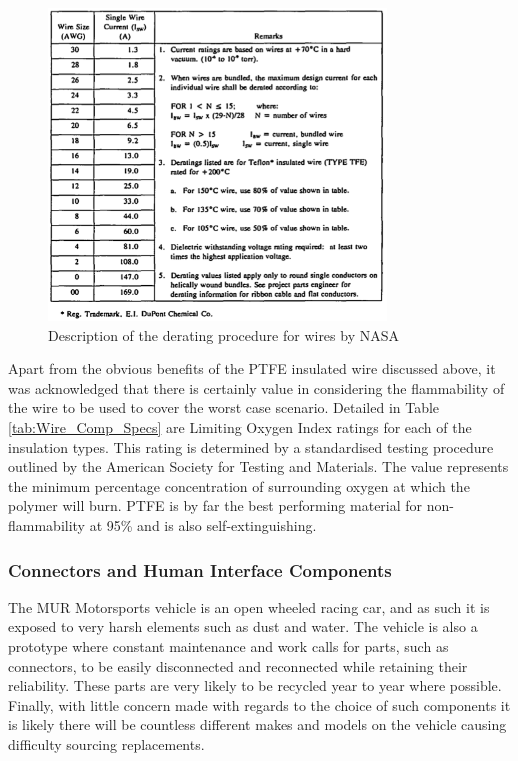 \begin{figure}[h!]
	\centering
	\includegraphics[width=0.8\textwidth]{NASA_wire_derating.png}
	\caption{Description of the derating procedure for wires by NASA\cite{MIL-STD-975M}}
	\label{fig:NASA_derate}
\end{figure}

Apart from the obvious benefits of the PTFE insulated wire discussed above, it was acknowledged that there is certainly value in considering the flammability of the wire to be used to cover the worst case scenario.  Detailed in Table \ref{tab:Wire_Comp_Specs} are Limiting Oxygen Index ratings for each of the insulation types.  This rating is determined by a standardised testing procedure outlined by the American Society for Testing and Materials\cite{ATSM_D570}.  The value represents the minimum percentage concentration of surrounding oxygen at which the polymer will burn.  PTFE is by far the best performing material for non-flammability at 95\% and is also self-extinguishing.

\subsubsection{Connectors and Human Interface Components}

The MUR Motorsports vehicle is an open wheeled racing car, and as such it is exposed to very harsh elements such as dust and water.  The vehicle is also a prototype where constant maintenance and work calls for parts, such as connectors, to be easily disconnected and reconnected while retaining their reliability.  These parts are very likely to be recycled year to year where possible.  Finally, with little concern made with regards to the choice of such components it is likely there will be countless different makes and models on the vehicle causing difficulty sourcing replacements.

